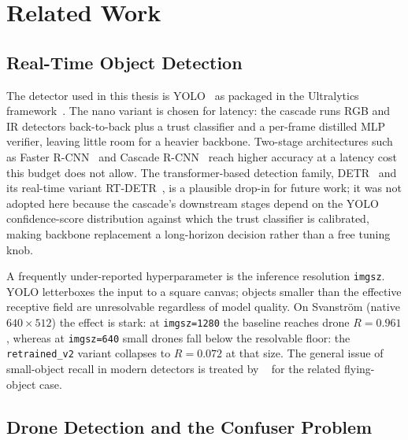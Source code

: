 \chapter{Related Work}
\label{ch:literature}

\section{Real-Time Object Detection}
\label{sec:lit_objdet}

The detector used in this thesis is YOLO~\cite{redmon2016yolo} as packaged in the Ultralytics framework~\cite{ultralytics2024}. The nano variant is chosen for latency: the cascade runs RGB and IR detectors back-to-back plus a trust classifier and a per-frame distilled MLP verifier, leaving little room for a heavier backbone. Two-stage architectures such as Faster R-CNN~\cite{ren2015fasterrcnn} and Cascade R-CNN~\cite{cai2018cascade} reach higher accuracy at a latency cost this budget does not allow. The transformer-based detection family, DETR~\cite{carion2020detr} and its real-time variant RT-DETR~\cite{zhao2024rtdetr}, is a plausible drop-in for future work; it was not adopted here because the cascade's downstream stages depend on the YOLO confidence-score distribution against which the trust classifier is calibrated, making backbone replacement a long-horizon decision rather than a free tuning knob.

A frequently under-reported hyperparameter is the inference resolution \texttt{imgsz}. YOLO letterboxes the input to a square canvas; objects smaller than the effective receptive field are unresolvable regardless of model quality. On Svanstr\"om (native $640\times512$) the effect is stark: at \texttt{imgsz=1280} the baseline reaches drone $R=0.961$, whereas at \texttt{imgsz=640} small drones fall below the resolvable floor: the \texttt{retrained\_v2} variant collapses to $R=0.072$ at that size. The general issue of small-object recall in modern detectors is treated by \citeauthor{rozantsev2017detecting}~\cite{rozantsev2017detecting} for the related flying-object case.

\section{Drone Detection and the Confuser Problem}
\label{sec:lit_drone}

